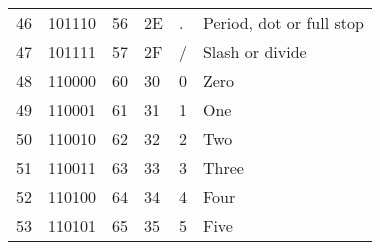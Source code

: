 \begin{center}
\begin{longtable}{llllll}
\rowcolor[HTML]{F3F6F6} 
{\color[HTML]{404040} 46}               & {\color[HTML]{404040} 101110}          & {\color[HTML]{404040} 56}             & {\color[HTML]{404040} 2E}                   & {\color[HTML]{404040} .}                  & {\color[HTML]{404040} Period, dot or full stop}              \\
\rowcolor[HTML]{FCFCFC} 
{\color[HTML]{404040} 47}               & {\color[HTML]{404040} 101111}          & {\color[HTML]{404040} 57}             & {\color[HTML]{404040} 2F}                   & {\color[HTML]{404040} /}                  & {\color[HTML]{404040} Slash or divide}                       \\
\rowcolor[HTML]{F3F6F6} 
{\color[HTML]{404040} 48}               & {\color[HTML]{404040} 110000}          & {\color[HTML]{404040} 60}             & {\color[HTML]{404040} 30}                   & {\color[HTML]{404040} 0}                  & {\color[HTML]{404040} Zero}                                  \\
\rowcolor[HTML]{FCFCFC} 
{\color[HTML]{404040} 49}               & {\color[HTML]{404040} 110001}          & {\color[HTML]{404040} 61}             & {\color[HTML]{404040} 31}                   & {\color[HTML]{404040} 1}                  & {\color[HTML]{404040} One}                                   \\
\rowcolor[HTML]{F3F6F6} 
{\color[HTML]{404040} 50}               & {\color[HTML]{404040} 110010}          & {\color[HTML]{404040} 62}             & {\color[HTML]{404040} 32}                   & {\color[HTML]{404040} 2}                  & {\color[HTML]{404040} Two}                                   \\
\rowcolor[HTML]{FCFCFC} 
{\color[HTML]{404040} 51}               & {\color[HTML]{404040} 110011}          & {\color[HTML]{404040} 63}             & {\color[HTML]{404040} 33}                   & {\color[HTML]{404040} 3}                  & {\color[HTML]{404040} Three}                                 \\
\rowcolor[HTML]{F3F6F6} 
{\color[HTML]{404040} 52}               & {\color[HTML]{404040} 110100}          & {\color[HTML]{404040} 64}             & {\color[HTML]{404040} 34}                   & {\color[HTML]{404040} 4}                  & {\color[HTML]{404040} Four}                                  \\
\rowcolor[HTML]{FCFCFC} 
{\color[HTML]{404040} 53}               & {\color[HTML]{404040} 110101}          & {\color[HTML]{404040} 65}             & {\color[HTML]{404040} 35}                   & {\color[HTML]{404040} 5}                  & {\color[HTML]{404040} Five}                                  \\

\end{longtable}
\end{center}

